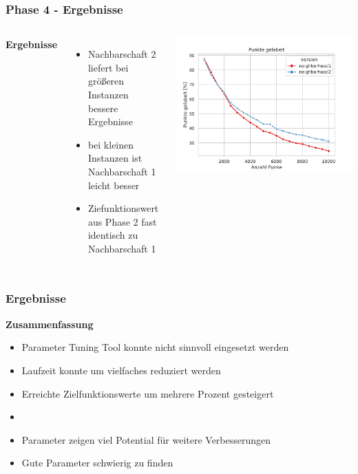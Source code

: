 \documentclass[aspectratio=169]{beamer}
\begin{document}
\begin{frame}
\frametitle{Phase 4 - Ergebnisse}
\begin{columns}[c] %
	
	\textbf{Ergebnisse}
	\begin{itemize}
		\item Nachbarschaft 2 liefert bei größeren Instanzen bessere Ergebnisse
		\item bei kleinen Instanzen ist Nachbarschaft 1 leicht besser
		\item Ziefunktionswert aus Phase 2 fast identisch zu Nachbarschaft 1
	\end{itemize}
	\includegraphics[scale=.45]{sol_neighborhood.pdf}	
\end{columns}
\end{frame}


\begin{frame}
\frametitle{Ergebnisse}
\textbf{Zusammenfassung}

\begin{itemize}
	\item Parameter Tuning Tool konnte nicht sinnvoll eingesetzt werden
	\item Laufzeit konnte um vielfaches reduziert werden
	\item Erreichte Zielfunktionswerte um mehrere Prozent gesteigert
	\item[]
	\item Parameter zeigen viel Potential für weitere Verbesserungen
	\item Gute Parameter schwierig zu finden
\end{itemize}

\end{frame}
\end{document}
